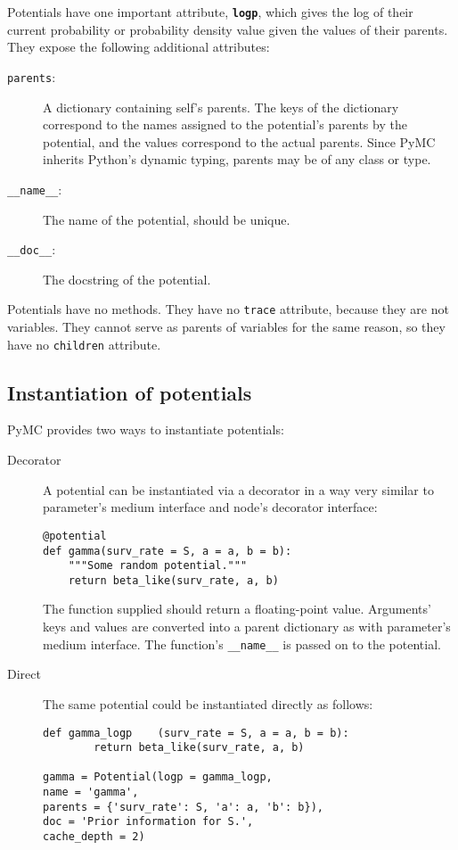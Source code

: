 \bigskip
Potentials have one important attribute, \texttt{\bfseries logp}, which gives the log of their current probability or probability density value given the values of their parents. They expose the following additional attributes:
\begin{description}
    \item[\texttt{parents}:] A dictionary containing self's parents. The keys of the dictionary correspond to the names assigned to the potential's parents by the potential, and the values correspond to the actual parents. Since PyMC inherits Python's dynamic typing, parents may be of any class or type.
    \item[\texttt{\_\_name\_\_}:] The name of the potential, should be unique.
    \item[\texttt{\_\_doc\_\_}:] The docstring of the potential.
\end{description}
Potentials have no methods. They have no \texttt{trace} attribute, because they are not variables. They cannot serve as parents of variables for the same reason, so they have no \texttt{children} attribute.


\subsection{Instantiation of potentials}
PyMC provides two ways to instantiate potentials:
\begin{description}
    \item[Decorator] A potential can be instantiated via a decorator in a way very similar to parameter's medium interface and node's decorator interface:
\begin{verbatim}
@potential
def gamma(surv_rate = S, a = a, b = b):
    """Some random potential."""
    return beta_like(surv_rate, a, b)
\end{verbatim}
The function supplied should return a floating-point value. Arguments' keys and values are converted into a parent dictionary as with parameter's medium interface. The function's \texttt{\_\_name\_\_} is passed on to the potential.
    \item[Direct] The same potential could be instantiated directly as follows:
\begin{verbatim}
def gamma_logp    (surv_rate = S, a = a, b = b):
        return beta_like(surv_rate, a, b)
        
gamma = Potential(logp = gamma_logp, 
name = 'gamma',
parents = {'surv_rate': S, 'a': a, 'b': b}),
doc = 'Prior information for S.',
cache_depth = 2)
\end{verbatim}
\end{description}

